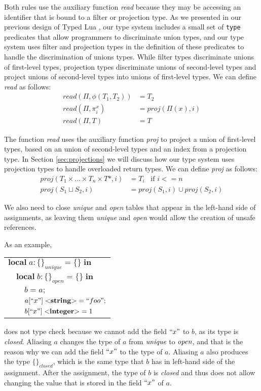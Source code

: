 \documentclass{sigplanconf}
\newcommand{\Integer}{\mathbf{integer}}
\newcommand{\String}{\mathbf{string}}
\newcommand{\penv}{\Pi}
\begin{document}
Both rules use the auxiliary function \emph{read} because they may be
accessing an identifier that is bound to a filter or projection type.
As we presented in our previous design of Typed Lua \cite{maidl2014tl},
our type system includes a small set of \texttt{type} predicates that allow
programmers to discriminate union types, and our type system uses filter and
projection types in the definition of these predicates to handle the discrimination
of unions types.
While filter types discriminate unions of first-level types, projection
types discriminate unions of second-level types and project unions of
second-level types into unions of first-level types.
We can define \emph{read} as follows:
\begin{align*}
read(\penv, \phi(T_{1},T_{2})) & = T_{2}\\
read(\penv, \pi_{i}^{x}) & = proj(\penv(x), i)\\
read(\penv, T) & = T
\end{align*}

The function \emph{read} uses the auxiliary function \emph{proj}
to project a union of first-level types, based on an union of
second-level types and an index from a projection type.
In Section \ref{sec:projections} we will discuss how our type system uses
projection types to handle overloaded return types.
We can define \emph{proj} as follows:
\begin{align*}
proj(T_{1} \times ... \times T_{n} \times T{*}, i) & =  T_{i} \;\;\; \text{if $i <= n$}\\
proj(S_{1} \sqcup S_{2}, i) & = proj(S_{1}, i) \cup proj(S_{2}, i)
\end{align*}

We also need to close \emph{unique} and \emph{open} tables that
appear in the left-hand side of assignments, as leaving them
\emph{unique} and \emph{open} would allow the creation of
unsafe references.

As an example,
\begin{center}
\begin{tabular}{lll}
\multicolumn{3}{l}{$\mathbf{local} \; a:\{\}_{unique} = \{\} \; \mathbf{in}$}\\
& \multicolumn{2}{l}{$\mathbf{local} \; b:\{\}_{open} = \{\} \; \mathbf{in}$}\\
& & \multicolumn{1}{l}{$b = a;$}\\
& & \multicolumn{1}{l}{$a[``x"] \; {<}\String{>} = ``foo";$}\\
& & \multicolumn{1}{l}{$b[``x"] \; {<}\Integer{>} = 1$}\\
\end{tabular}
\end{center}
does not type check because we cannot add the field $``x"$ to $b$,
as its type is \emph{closed}.
Aliasing $a$ changes the type of $a$ from $\emph{unique}$ to
$\emph{open}$, and that is the reason why we can add the field
$``x"$ to the type of $a$.
Aliasing $a$ also produces the type $\{\}_{closed}$, which is
the same type that $b$ has in left-hand side of the assignment.
After the assignment, the type of $b$ is \emph{closed} and thus
does not allow changing the value that is stored in the field
$``x"$ of $a$.
\end{document}
